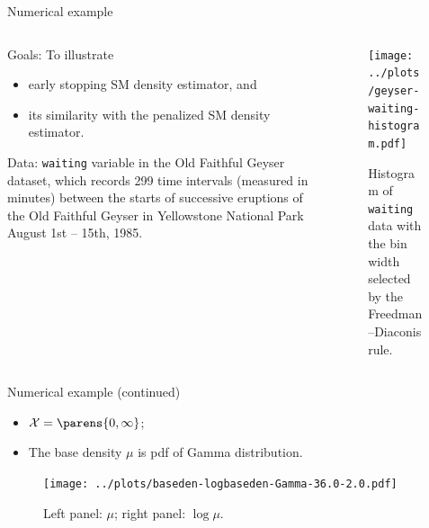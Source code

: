 \documentclass[aspectratio=169,xcolor=dvipsnames]{beamer}
\begin{document}
\begin{frame}{Numerical example}
	
	\begin{columns}[c]
	    \begin{column}{.5\textwidth}
	    
			{\color{defaultcolor} Goals:} To illustrate 
			\begin{itemize}
				\item early stopping SM density estimator, and 
				\item its similarity with the penalized SM density estimator. 
			\end{itemize}
			
			\vspace{10pt}
			
			{\color{defaultcolor} Data:} \texttt{waiting} variable in the Old Faithful Geyser dataset, which records 299 time intervals (measured in minutes) between the starts of successive eruptions of the Old Faithful Geyser in Yellowstone National Park August 1st -- 15th, 1985. 
			
		\end{column}
		
	    \begin{column}{.5\textwidth}

			\begin{figure}
				\centering
				\texttt{[image: ../plots/geyser-waiting-histogram.pdf]}
				\caption{Histogram of \texttt{waiting} data with the bin width selected by the Freedman--Diaconis rule.}
				\label{fig-histogram}
			\end{figure}
			
	    \end{column}
	\end{columns}
	
\end{frame}


\begin{frame}{Numerical example (continued)}
	
	\begin{itemize}
		\item $\mathcal{X} = \parens{0, \infty}$; 
		
		\vspace{5pt}
		
		\item The base density $\mu$ is pdf of Gamma distribution. %
		
	\end{itemize}
	
	\vspace{-10pt}
	
	\begin{figure}
		\centering
		\texttt{[image: ../plots/baseden-logbaseden-Gamma-36.0-2.0.pdf]}
		\caption{Left panel: $\mu$; right panel: $\log \mu$.}
		\label{fig-base-den-log}
	\end{figure}
	
\end{frame}
\end{document}

